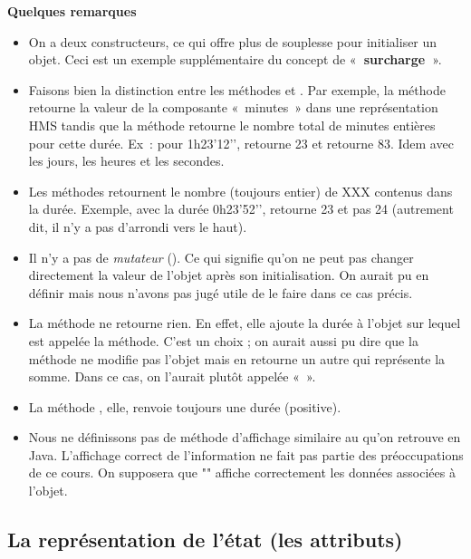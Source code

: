 		\textbf{Quelques remarques}
		\begin{itemize}
			\item
				On a deux constructeurs, ce qui offre plus de souplesse pour initialiser
				un objet. Ceci est un exemple supplémentaire du concept de
				«\textbf{~surcharge~}».
			\item
				Faisons bien la distinction entre les méthodes
				 et . Par
				exemple, la méthode  retourne la valeur
				de la composante «~minutes~» dans une représentation HMS tandis que la
				méthode  retourne le nombre total
				de minutes entières pour cette durée. Ex~: pour 1h23’12’’,
				 retourne 23 et
				 retourne 83. Idem avec 
				les jours, les heures et les secondes.
			\item 
				Les méthodes  retournent le nombre
				(toujours entier) de XXX contenus dans la durée. Exemple, avec la durée
				0h23’52'’, 
				retourne 23 et pas 24 (autrement dit, il n’y a pas d’arrondi vers le
				haut).
			\item 
				Il n’y a pas de \textit{mutateur }(). Ce qui
				signifie qu’on ne peut pas changer directement la valeur de l’objet
				après son initialisation. On aurait pu en définir mais nous
				n'avons pas jugé utile de le faire dans ce cas
				précis.
			\item 
				La méthode  ne retourne rien. En effet,
				elle ajoute la durée à l’objet sur lequel est appelée la méthode. C’est
				un choix ; on aurait aussi pu dire que la méthode ne modifie pas
				l’objet mais en retourne un autre qui représente la somme. Dans ce cas,
				on l’aurait plutôt appelée «~».
			\item 
				La méthode , elle, renvoie toujours une
				durée (positive).
			\item 
				Nous ne définissons pas de méthode d'affichage
				similaire au  qu'on retrouve en Java.
				L'affichage correct de l'information ne fait pas partie
				des préoccupations de ce cours.
				On supposera que ""
				affiche correctement les données associées à l'objet.
		\end{itemize}
	
	\subsection{La représentation de l'état (les attributs)}
	
